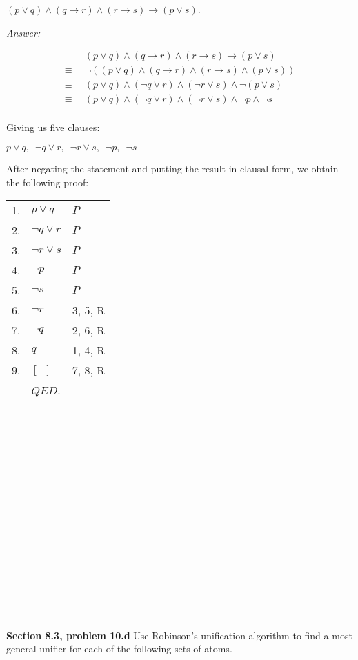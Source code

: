 \documentclass[12pt]{article}
\begin{document}
$(p \lor q) \land (q \rightarrow r) \land (r \rightarrow s) \rightarrow (p \lor s)$.

\emph{Answer:} 

\begin{align*}
& (p \lor q) \land (q \rightarrow r) \land (r \rightarrow s) \rightarrow (p \lor s) \\
        \equiv \enspace & \neg ((p \lor q) \land (q \rightarrow r) \land (r \rightarrow s) \land (p \lor s)) \\
        \equiv \enspace & (p \lor q) \land (\neg q \lor r) \land (\neg r \lor s) \land \neg (p \lor s) \\
        \equiv \enspace & (p \lor q) \land (\neg q \lor r) \land (\neg r \lor s) \land \neg p \land \neg s \\
\end{align*}

Giving us five clauses:

\begin{center}
     $p \lor q, \enspace \neg q \lor r, \enspace \neg r \lor s, \enspace \neg p, \enspace \neg s$
\end{center}

After negating the statement and putting the result in clausal form, we obtain the following proof:

\begin{tabular}{p{.8cm}p{8.5cm}l}
1.  & $p \lor q$           & $P$ \\
2.  & $\neg q \lor r$      & $P$ \\
3.  & $\neg r \lor s$      & $P$ \\
4.  & $\neg p$             & $P$ \\   
5.  & $\neg s$             & $P$ \\
6.  & $\neg r$             & 3, 5, R \\
7.  & $\neg q$             & 2, 6, R \\
8.  & $q$                  & 1, 4, R \\
9.  & $[ \enspace ]$       & 7, 8, R \\
& $QED$. \\
\end{tabular}
\\
\\
\\
\\
\\
\\
\\
\\
\\
\\
\\
\\
\\
\\
\\
\\
\textbf{Section 8.3, problem 10.d}   Use Robinson’s unification algorithm to find a most general 
unifier for each of the following sets of atoms.
\end{document}
